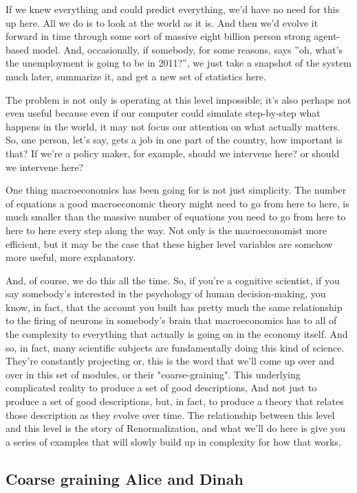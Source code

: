 \documentclass[]{article}
\begin{document}
If we knew everything and could predict everything, we'd have no need for this up here. All we do is to look at the world as it is.
And then we'd evolve it forward in time through some sort of massive eight billion person strong agent-based model. And, occasionally, if somebody, for some reasons, says ''oh, what's the unemployment is going to be in 2011?'', we just take a snapshot of the system much later, summarize it, and get a new set of statistics here.

The problem is not only is operating at this level impossible; it's also perhaps not even useful because even if our computer could simulate step-by-step what happens in the world, it may not focus our attention on what actually matters.
So, one person, let's say, gets a job in one part of the country, how important is that?
If we're a policy maker, for example, should we intervene here?
or should we intervene here?

One thing macroeconomics has been going for is not just simplicity.
The number of equations a good  macroeconomic theory might need to go from here to here, is much smaller than the massive number of equations you need to go from here to here to here every step along the way.
Not only is the macroeconomist more efficient, but it may be the case that these higher level variables are somehow more useful, more explanatory.

And, of course, we 
do this all the time.
So, if you're a cognitive scientist, 
if you say somebody's interested
in the psychology of human 
decision-making, you know, in fact,
that the account you built has pretty 
much the same relationship
to the firing of neurons 
in somebody's brain
that macroeconomics has to 
all of the complexity to everything
that actually is going on in 
the economy itself.
And so, in fact, many 
scientific subjects are
fundamentally doing 
this kind of science.
They're constantly projecting or,
this is the word that we'll 
come up over and over in this
set of modules, or 
their "coarse-graining".
This underlying complicated reality to 
produce a set of good descriptions,
And not just to produce a set of 
good descriptions, but, in fact,
to produce a theory that relates those 
description as they evolve over time.
The relationship 
between this level
and this level is the 
story of Renormalization,
and what we'll do here is give
you a series of examples
that will slowly build up in 
complexity for how that works.

\subsection{Coarse graining Alice and Dinah}
\end{document}
